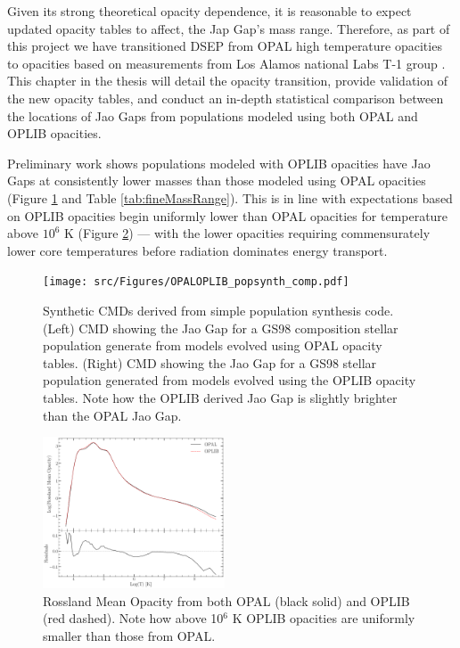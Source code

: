 Given its strong theoretical opacity dependence, it is reasonable to expect
updated opacity tables to affect, the Jap Gap's mass range. Therefore, as part
of this project we have transitioned DSEP from OPAL high temperature opacities
to opacities based on measurements from Los Alamos national Labs T-1 group
\citep[OPLIB][]{Colgan2016}. This chapter in the thesis will detail the opacity
transition, provide validation of the new opacity tables, and conduct an
in-depth statistical comparison between the locations of Jao Gaps from
populations modeled using both OPAL and OPLIB opacities.

Preliminary work shows populations modeled with OPLIB opacities have Jao Gaps
at consistently lower masses than those modeled using OPAL opacities (Figure
\ref{fig:JaoGapOPALOPLIB} and Table \ref{tab:fineMassRange}). This is in line
with expectations based on OPLIB opacities begin uniformly lower than OPAL
opacities for temperature above $10^{6}$ K (Figure \ref{fig:opacComp}) --- with
the lower opacities requiring commensurately lower core temperatures before
radiation dominates energy transport. 

\begin{figure}
	\centering
	\texttt{[image: src/Figures/OPALOPLIB\_popsynth\_comp.pdf]}
	\caption{Synthetic CMDs derived from simple population synthesis code.
	(Left) CMD showing the Jao Gap for a GS98 composition stellar population
	generate from models evolved using OPAL opacity tables. (Right) CMD showing
	the Jao Gap for a GS98 stellar population generated from models evolved
	using the OPLIB opacity tables. Note how the OPLIB derived Jao Gap is
	slightly brighter than the OPAL Jao Gap.}
	\label{fig:JaoGapOPALOPLIB}
\end{figure}

\begin{figure}
	\centering
	\includegraphics[width=0.48\textwidth]{src/Figures/OpacityComparision.pdf}
	\caption{Rossland Mean Opacity from both OPAL (black solid) and OPLIB (red
	dashed). Note how above 10$^{6}$ K OPLIB opacities are uniformly smaller
	than those from OPAL.}
	\label{fig:opacComp}
\end{figure}

